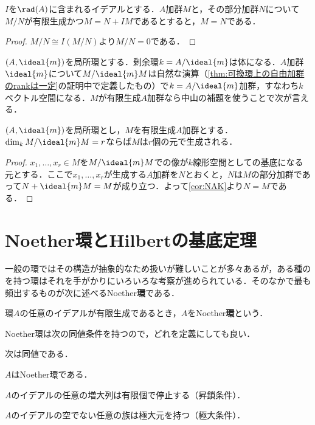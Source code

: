 \begin{cor}\label{cor:NAK}
	$I$を$\rad(A)$に含まれるイデアルとする．$A$加群$M$と，その部分加群$N$について$M/N$が有限生成かつ$M=N+IM$であるとすると，$M=N$である．
\end{cor}

\begin{proof}
	$M/N\cong I(M/N)$より$M/N=0$である．
\end{proof}

$(A,\ideal{m})$を局所環とする．剰余環$k=A/\ideal{m}$は体になる．$A$加群$\ideal{m}$について$M/\ideal{m}M$は自然な演算（\ref{thm:可換環上の自由加群のrankは一定}の証明中で定義したもの）で$k=A/\ideal{m}$加群，すなわち$k$ベクトル空間になる．$M$が有限生成$A$加群なら中山の補題を使うことで次が言える．

\begin{prop}\label{prop:Atimac_prop_2.8}
	$(A,\ideal{m})$を局所環とし，$M$を有限生成$A$加群とする．$\dim_k M/\ideal{m}M=r$ならば$M$は$r$個の元で生成される．
\end{prop}

\begin{proof}
	$x_1,\dots,x_r\in M$を$M/\ideal{m}M$での像が$k$線形空間としての基底になる元とする．ここで$x_1,\dots,x_r$が生成する$A$加群を$N$とおくと，$N$は$M$の部分加群であって$N+\ideal{m}M=M$が成り立つ．よって\ref{cor:NAK}より$N=M$である．
\end{proof}

\section{Noether環とHilbertの基底定理}

一般の環ではその構造が抽象的なため扱いが難しいことが多々あるが，ある種のを持つ環はそれを手がかりにいろいろな考察が進められている．そのなかで最も頻出するものが次に述べるNoether\textbf{環}である．

\begin{defi}[Noether環]\label{defi:Noether環}
	環$A$の任意のイデアルが有限生成であるとき，$A$をNoether\textbf{環}という．
\end{defi}

Noether環は次の同値条件を持つので，どれを定義にしても良い．

\begin{prop}
	次は同値である．
	\begin{sakura}
		\item $A$はNoether環である．
		\item $A$のイデアルの任意の増大列は有限個で停止する（昇鎖条件）．
		\item $A$のイデアルの空でない任意の族は極大元を持つ（極大条件）．
	\end{sakura}
\end{prop}

